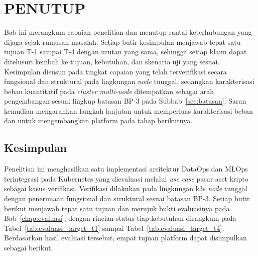 \cleardoublepage
\chapter{PENUTUP}
\label{chap:penutup}

Bab ini merangkum capaian penelitian dan menutup rantai keterhubungan yang dijaga sejak rumusan masalah. Setiap butir kesimpulan menjawab tepat satu tujuan T-1 sampai T-4 dengan urutan yang sama, sehingga setiap klaim dapat ditelusuri kembali ke tujuan, kebutuhan, dan skenario uji yang sesuai. Kesimpulan disusun pada tingkat capaian yang telah terverifikasi secara fungsional dan struktural pada lingkungan \textit{node} tunggal, sedangkan karakterisasi beban kuantitatif pada \textit{cluster} \textit{multi-node} ditempatkan sebagai arah pengembangan sesuai lingkup batasan BP-3 pada Subbab~\ref{sec:batasan}. Saran kemudian mengarahkan langkah lanjutan untuk memperluas karakterisasi beban dan untuk mengembangkan platform pada tahap berikutnya.

\section{Kesimpulan}
\label{sec:kesimpulan}

Penelitian ini menghasilkan satu implementasi arsitektur DataOps dan MLOps terintegrasi pada Kubernetes yang dievaluasi melalui \textit{use case} pasar aset kripto sebagai kasus verifikasi. Verifikasi dilakukan pada lingkungan k3s \textit{node} tunggal dengan penerimaan fungsional dan struktural sesuai batasan BP-3. Setiap butir berikut menjawab tepat satu tujuan dan merujuk bukti evaluasinya pada Bab~\ref{chap:evaluasi}, dengan rincian status tiap kebutuhan dirangkum pada Tabel~\ref{tab:evaluasi_target_t1} sampai Tabel~\ref{tab:evaluasi_target_t4}. Berdasarkan hasil evaluasi tersebut, empat tujuan platform dapat disimpulkan sebagai berikut.

